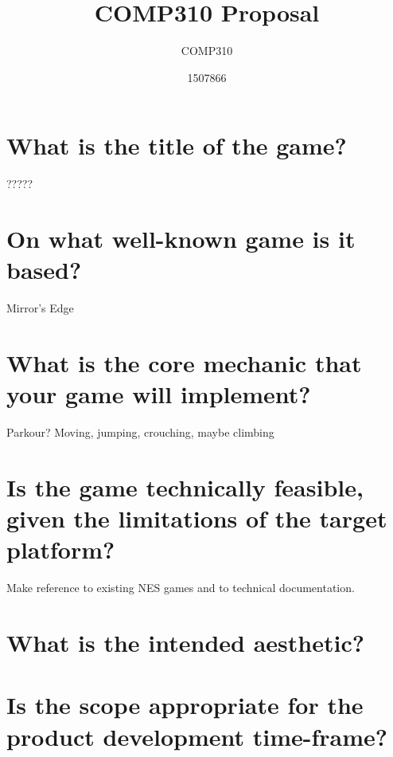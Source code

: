 \documentclass{scrartcl}
\title{COMP310 Proposal}
\subtitle{COMP310}
\author{1507866}
\begin{document}
	
\maketitle
\section{What is the title of the game?}
?????
\section{On what well-known game is it based?}
Mirror's Edge

\section{What is the core mechanic that your game will implement?}
Parkour? Moving, jumping, crouching, maybe climbing 

\section{Is the game technically feasible, given the limitations of the target platform?}
Make reference to existing NES games and to technical documentation.

\section{What is the intended aesthetic?}


\section{Is the scope appropriate for the product development time-frame?}

	
\end{document}
